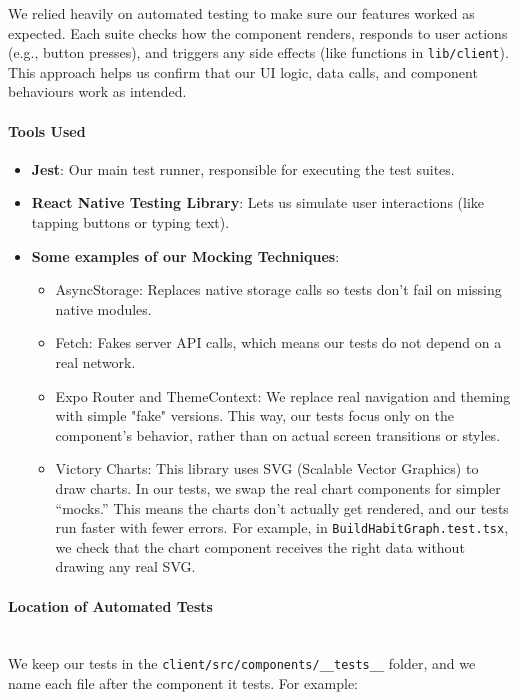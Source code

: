 We relied heavily on automated testing to make sure our features worked as expected. Each suite checks how the component renders, responds to user actions (e.g., button presses), and triggers any side effects (like functions in \texttt{lib/client}). This approach helps us confirm that our UI logic, data calls, and component behaviours work as intended.

\paragraph{Tools Used} \begin{itemize} \item \textbf{Jest}: Our main test runner, responsible for executing the test suites. \item \textbf{React Native Testing Library}: Lets us simulate user interactions (like tapping buttons or typing text). \item \textbf{Some examples of our Mocking Techniques}: \begin{itemize} \item{AsyncStorage}: Replaces native storage calls so tests don’t fail on missing native modules. \item{Fetch}: Fakes server API calls, which means our tests do not depend on a real network. \item {Expo Router and ThemeContext:}
We replace real navigation and theming with simple "fake" versions. This way, our tests focus only on the component’s behavior, rather than on actual screen transitions or styles. \item {Victory Charts}: This library uses SVG (Scalable Vector Graphics) to draw charts. In our tests, we swap the real chart components for simpler “mocks.” This means the charts don’t actually get rendered, and our tests run faster with fewer errors. For example, in \texttt{BuildHabitGraph.test.tsx}, we check that the chart component receives the right data without drawing any real SVG. \end{itemize} \end{itemize}


\paragraph{Location of Automated Tests}\mbox{}\\

We keep our tests in the \texttt{client/src/components/\_\_tests\_\_} folder, and we name each file after the component it tests. For example:

